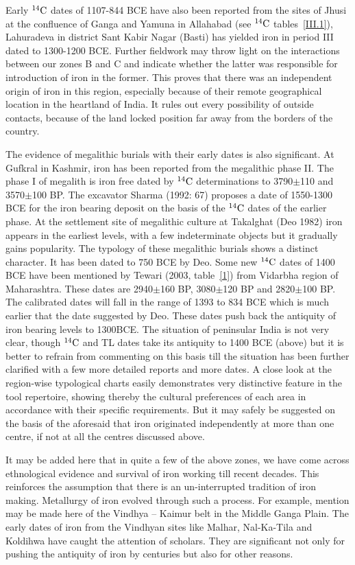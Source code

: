 Early $^{14}{\rm C}$ dates of 1107-844 BCE have also been reported from the sites of Jhusi at the confluence of Ganga and Yamuna in Allahabad (see $^{14}{\rm C}$ tables~\ref{III.1}), Lahuradeva in district Sant Kabir Nagar (Basti) has yielded iron in period III dated to 1300-1200 BCE. Further fieldwork may throw light on the interactions between our zones B and C and indicate whether the latter was responsible for introduction of iron in the former. This proves that there was an independent origin of iron in this region, especially because of their remote geographical location in the heartland of India. It rules out every possibility of outside contacts, because of the land locked position far away from the borders of the country.

The evidence of megalithic burials with their early dates is also significant. At Gufkral in Kashmir, iron has been reported from the megalithic phase II. The phase I of megalith is iron free dated by $^{14}{\rm C}$ determinations to 3790$\pm$110 and 3570$\pm$100 BP. The excavator Sharma (1992: 67) proposes a date of 1550-1300 BCE for the iron bearing deposit on the basis of the $^{14}{\rm C}$ dates of the earlier phase. At the settlement site of megalithic culture at Takalghat (Deo 1982) iron appears in the earliest levels, with a few indeterminate objects but it gradually gains popularity. The typology of these megalithic burials shows a distinct character. It has been dated to 750 BCE by Deo. Some new $^{14}{\rm C}$ dates of 1400 BCE have been mentioned by Tewari (2003, table~\ref{1}) from Vidarbha region of Maharashtra. These dates are 2940$\pm$160 BP, 3080$\pm$120 BP and 2820$\pm$100 BP. The calibrated dates will fall in the range of 1393 to 834 BCE which is much earlier that the date suggested by Deo. These dates push back the antiquity of iron bearing levels to 1300BCE. The situation of peninsular India is not very clear, though $^{14}{\rm C}$ and TL dates take its antiquity to 1400 BCE (above) but it is better to refrain from commenting on this basis till the situation has been further clarified with a few more detailed reports and more dates. A close look at the region-wise typological charts easily demonstrates very distinctive feature in the tool repertoire, showing thereby the cultural preferences of each area in accordance with their specific requirements. But it may safely be suggested on the basis of the aforesaid that iron originated independently at more than one centre, if not at all the centres discussed above.

It may be added here that in quite a few of the above zones, we have come across ethnological evidence and survival of iron working till recent decades. This reinforces the assumption that there is an un-interrupted tradition of iron making. Metallurgy of iron evolved through such a process. For example, mention may be made here of the Vindhya – Kaimur belt in the Middle Ganga Plain. The early dates of iron from the Vindhyan sites like Malhar, Nal-Ka-Tila and Koldihwa have caught the attention of scholars. They are significant not only for pushing the antiquity of iron by centuries but also for other reasons.

